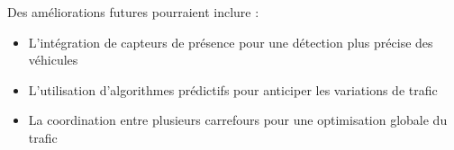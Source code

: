 \documentclass[11pt,a4paper]{article}
\begin{document}
Des améliorations futures pourraient inclure :
\begin{itemize}
    \item L'intégration de capteurs de présence pour une détection plus précise des véhicules
    \item L'utilisation d'algorithmes prédictifs pour anticiper les variations de trafic
    \item La coordination entre plusieurs carrefours pour une optimisation globale du trafic
\end{itemize}
\end{document}
